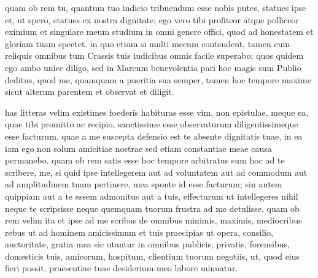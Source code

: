  quam ob rem tu, quantum tuo indicio tribuendum esse nobis putes, statues ipse et, ut spero, statues ex nostra dignitate; ego vero tibi profiteor atque polliceor eximium et singulare meum studium in omni genere offici, quod ad honestatem et gloriam tuam spectet. in quo etiam si multi mecum contendent, tamen cum reliquis omnibus tum Crassis tuis iudicibus omnis facile superabo; quos quidem ego ambo unice diligo, sed in Marcum benevolentia pari hoc magis sum Publio deditus, quod me, quamquam a pueritia sua semper, tamen hoc tempore maxime sicut alterum parentem et observat et diligit.

 has litteras velim existimes foederis habituras esse vim, non epistulae, meque ea, quae tibi promitto ac recipio, sanctissime esse observaturum diligentissimeque esse facturum. quae a me suscepta defensio est te absente dignitatis tuae, in ea iam ego non solum amicitiae nostrae sed etiam constantiae meae causa permanebo. quam ob rem satis esse hoc tempore arbitratus sum hoc ad te scribere, me, si quid ipse intellegerem aut ad voluntatem aut ad commodum aut ad amplitudinem tuam pertinere, mea sponte id esse facturum; sin autem quippiam aut a te essem admonitus aut a tuis, effecturum ut intellegeres nihil neque te scripsisse neque quemquam tuorum frustra ad me detulisse. quam ob rem velim ita et ipse ad me scribas de omnibus minimis, maximis, mediocribus rebus ut ad hominem amicissimum et tuis praecipias ut opera, consilio, auctoritate, gratia mea sic utantur in omnibus publicis, privatis, forensibus, domesticis tuis, amicorum, hospitum, clientium tuorum negotiis, ut, quod eius fieri possit, praesentiae tuae desiderium meo labore minuatur.
